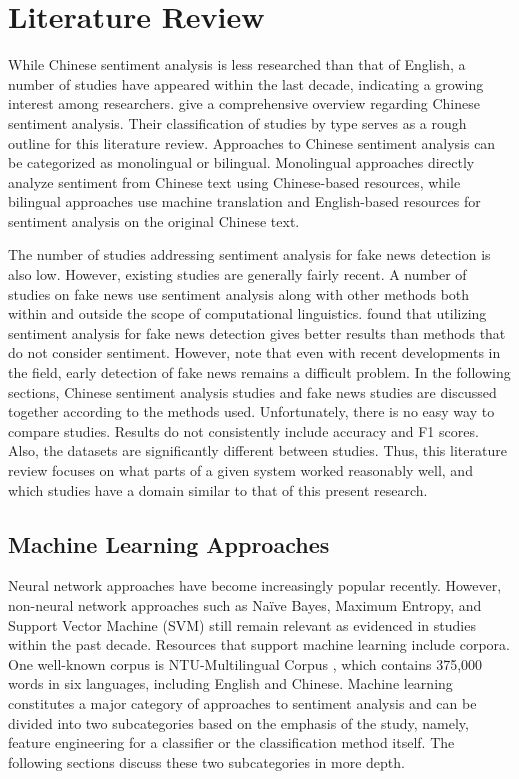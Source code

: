\documentclass [11pt, proquest] {uwthesis}[2020/02/24]
\begin{document}
 
 
\chapter{Literature Review}
 
While Chinese sentiment analysis is less researched than that of English, a number of studies have appeared within the last decade, indicating a growing interest among researchers. \cite{Peng2017} give a comprehensive overview regarding Chinese sentiment analysis. Their classification of studies by type serves as a rough outline for this literature review. Approaches to Chinese sentiment analysis can be categorized as monolingual or bilingual. Monolingual approaches directly analyze sentiment from Chinese text using Chinese-based resources, while bilingual approaches use machine translation and English-based resources for sentiment analysis on the original Chinese text. 

The number of studies addressing sentiment analysis for fake news detection is also low. However, existing studies are generally fairly recent. A number of studies on fake news use sentiment analysis along with other methods both within and outside the scope of computational linguistics. \cite{Ajao2019} found that utilizing sentiment analysis for fake news detection gives better results than methods that do not consider sentiment. However, \cite{Cui2019} note that even with recent developments in the field, early detection of fake news remains a difficult problem. In the following sections, Chinese sentiment analysis studies and fake news studies are discussed together according to the methods used. Unfortunately, there is no easy way to compare studies. Results do not consistently include accuracy and F1 scores. Also, the datasets are significantly different between studies. Thus, this literature review focuses on what parts of a given system worked reasonably well, and which studies have a domain similar to that of this present research.
 
\section{Machine Learning Approaches}
Neural network approaches have become increasingly popular recently. However, non-neural network approaches such as Naïve Bayes, Maximum Entropy, and Support Vector Machine (SVM) still remain relevant as evidenced in studies within the past decade. Resources that support machine learning include corpora. One well-known corpus is NTU-Multilingual Corpus \citep{Tan2011}, which contains 375,000 words in six languages, including English and Chinese. Machine learning constitutes a major category of approaches to sentiment analysis and can be divided into two subcategories based on the emphasis of the study, namely, feature engineering for a classifier or the classification method itself. The following sections discuss these two subcategories in more depth.
\end{document}
